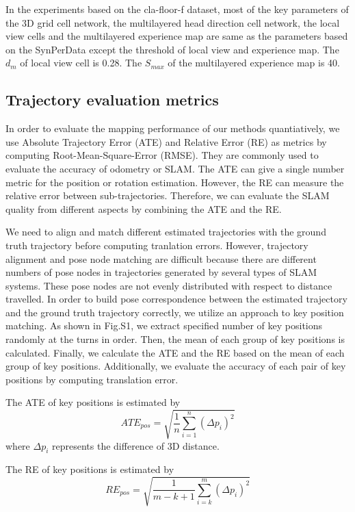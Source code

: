 In the experiments based on the cla-floor-f dataset, most of the key parameters of the 3D grid cell network, the multilayered head direction cell network, the local view cells and the multilayered experience map are same as the parameters based on the SynPerData except the threshold of local view and experience map.
The $ d_m $ of local view cell is 0.28.
The $ S_{max} $ of the multilayered experience map is 40.



\subsection{Trajectory evaluation metrics}

In order to evaluate the mapping performance of our methods quantiatively, we use Absolute Trajectory Error (ATE) and Relative Error (RE) as metrics by computing Root-Mean-Square-Error (RMSE).
They are commonly used to evaluate the accuracy of odometry or SLAM.
The ATE can give a single number metric for the position or rotation estimation.
However, the RE can measure the relative error between sub-trajectories.
Therefore, we can evaluate the SLAM quality from different aspects by combining the ATE and the RE.


We need to align and match different estimated trajectories with the ground truth trajectory before computing tranlation errors.
However, trajectory alignment and pose node matching are difficult because there are different numbers of pose nodes in trajectories generated by several types of SLAM systems.
These pose nodes are not evenly distributed with respect to distance travelled.
In order to build pose correspondence between the estimated trajectory and the ground truth trajectory correctly, we utilize an approach to key position matching.
As shown in Fig.S1, we extract specified number of key positions randomly at the turns in order.
Then, the mean of each group of key positions is calculated.
Finally, we calculate the ATE and the RE based on the mean of each group of key positions.
Additionally, we evaluate the accuracy of each pair of key positions by computing translation error.


The ATE of key positions is estimated by
\begin{equation}
	ATE_{pos} = \sqrt{ \frac{1}{n} \sum_{i=1}^{n} (\Delta p_i)^2 }
\end{equation}
where $ \Delta p_i $ represents the difference of 3D distance.


The RE of key positions is estimated by
\begin{equation}
	RE_{pos} = \sqrt{
					\frac{1}{m-k+1}
					\sum_{i=k}^{m}
					(\Delta p_i)^2
				}
\end{equation}





